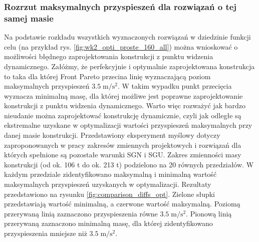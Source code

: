 \subsubsection{Rozrzut maksymalnych przyspieszeń dla rozwiązań o tej samej masie}
Na podstawie rozkładu wszystkich wyznaczonych rozwiązań w dziedzinie funkcji celu (na przykład rys. \ref{fig:wk2_opti_proste_160_all}) można wnioskować o możliwości błędnego zaprojektowania konstrukcji z punktu widzenia dynamicznego. Załóżmy, że perfekcyjnie i optymalnie zaprojektowana konstrukcja to taka dla której Front Pareto przecina linię wyznaczającą poziom maksymalnych przyspieszeń $3.5\;\mathrm{m/s^2}$. W takim wypadku punkt przecięcia wyznacza minimalną masę, dla której możliwe jest poprawne zaprojektowanie konstrukcji z punktu widzenia dynamicznego. Warto więc rozważyć jak bardzo nieudanie można zaprojektować konstrukcję dynamicznie, czyli jak odległe są ekstremalne uzyskane w optymalizacji wartości przyspieszeń maksymalnych przy danej masie konstrukcji. Przedstawiony eksperyment myślowy dotyczy zaproponowanych w pracy zakresów zmiennych projektowych i rozwiązań dla których spełnione są pozostałe warunki SGN i SGU. Zakres zmienności masy konstrukcji (od ok. 106 t do ok. 213 t) podzielono na 20 równych przedziałów. W każdym przedziale zidentyfikowano maksymalną i minimalną wartość maksymalnych przyspieszeń uzyskanych w optymalizacji. Rezultaty przedstawiono na rysunku \ref{fig:comparison_diffs_opt}. Zielone słupki przedstawiają wartość minimalną, a czerwone wartość maksymalną. Poziomą przerywaną linią zaznaczono przyspieszenia równe $3.5\;\mathrm{m/s^2}$. Pionową linią przerywaną zaznaczono minimalną masę, dla której zidentyfikowano przyspieszenia mniejsze niż $3.5\;\mathrm{m/s^2}$.
	
